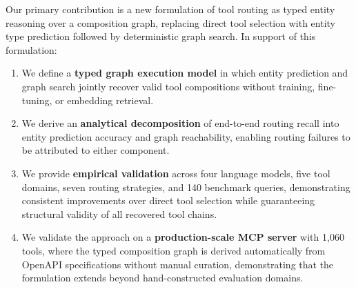 Our primary contribution is a new formulation of tool routing as typed entity reasoning over a composition graph, replacing direct tool selection with entity type prediction followed by deterministic graph search.
In support of this formulation:

\begin{enumerate}

\item We define a \textbf{typed graph execution model} in which entity prediction and graph search jointly recover valid tool compositions without training, fine-tuning, or embedding retrieval.

\item We derive an \textbf{analytical decomposition} of end-to-end routing recall into entity prediction accuracy and graph reachability, enabling routing failures to be attributed to either component.

\item We provide \textbf{empirical validation} across four language models, five tool domains, seven routing strategies, and 140 benchmark queries, demonstrating consistent improvements over direct tool selection while guaranteeing structural validity of all recovered tool chains.

\item We validate the approach on a \textbf{production-scale MCP server} with 1,060 tools, where the typed composition graph is derived automatically from OpenAPI specifications without manual curation, demonstrating that the formulation extends beyond hand-constructed evaluation domains.

\end{enumerate}
